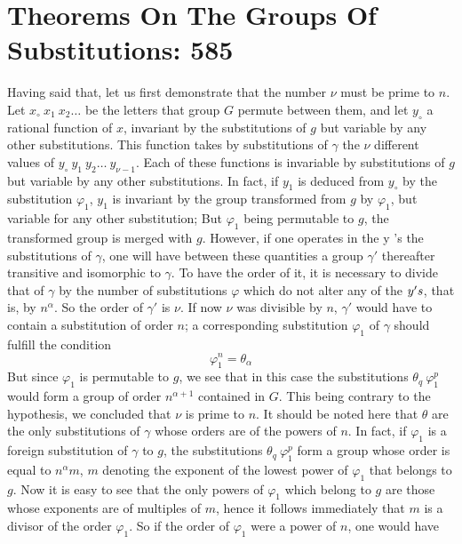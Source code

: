 \documentclass[11pt,fancy]{elegantbook}
\begin{document}
\section{Theorems On The Groups Of Substitutions: 585}

Having said that, let us first demonstrate that the number $\nu$ must be prime to $n$. Let $x_\circ \ x_1 \ x_2\dots$ be the letters that group $G$ permute between them, and let $y_\circ$ a rational function of $x$, invariant by the substitutions of $g$ but variable by any other substitutions. This function takes by substitutions of $\gamma$ the $\nu$ different values of $y_\circ \ y_1 \ y_2\dots \ y_{\nu-1}$. Each of these functions is invariable by substitutions of $g$ but variable by any other substitutions. In fact, if $y_1$ is deduced from $y_\circ$ by the substitution $\varphi_1$, $y_1$ is invariant by the group transformed from $g$ by $\varphi_1$, but variable for any other substitution; But $\varphi_1$ being permutable to $g$, the transformed group is merged with $g$. However, if one operates in the y \rq s the substitutions of $\gamma$, one will have between these quantities a group $\gamma'$ thereafter transitive and isomorphic to $\gamma$. To have the order of it, it is necessary to divide that of $\gamma$ by the number of substitutions $\varphi$ which do not alter any of the $y\rq s$, that is, by $n^\alpha$. So the order of $\gamma'$ is $\nu$. If now $\nu$ was divisible by $n$, $\gamma'$ would have to contain a substitution of order $n$; a corresponding substitution $\varphi_1$ of $\gamma$ should fulfill the condition
\begin{equation}
    \varphi_1^{n} = \theta_\alpha
\end{equation}
But since $\varphi_1$ is permutable to $g$, we see that in this case the substitutions $\theta_q \ \varphi_1^{p}$ would form a group of order $n^{\alpha+1}$ contained in $G$. This being contrary to the hypothesis, we concluded that $\nu$ is prime to $n$.
It should be noted here that $\theta$ are the only substitutions of $\gamma$ whose orders are of the powers of $n$. In fact, if $\varphi_1$ is a foreign substitution of $\gamma$ to $g$, the substitutions $\theta_q \ \varphi_1^{p}$ form a group whose order is equal to $n^\alpha{m}$, $m$ denoting the exponent of the lowest power of $\varphi_1$ that belongs to $g$.
Now it is easy to see that the only powers of $\varphi_1$ which belong to $g$ are those whose exponents are of multiples of $m$, hence it follows immediately that $m$ is a divisor of the order $\varphi_1$. So if the order of $\varphi_1$ were a power of $n$, one would have
\end{document}
